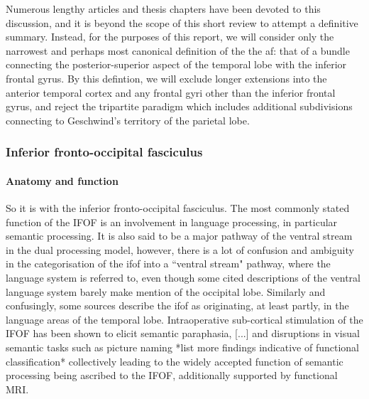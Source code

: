Numerous lengthy articles and thesis chapters have been devoted to this discussion, and it is beyond the scope of this short review to attempt a definitive summary.
Instead, for the purposes of this report, we will consider only the narrowest and perhaps most canonical definition of the the \gls{af}: that of a bundle connecting the posterior-superior aspect of the temporal lobe with the inferior frontal gyrus.
By this defintion, we will exclude longer extensions into the anterior temporal cortex\autocite{Giampiccolo2022a} and any frontal gyri other than the inferior frontal gyrus, and reject the tripartite paradigm which includes additional subdivisions connecting to Geschwind's territory of the parietal lobe.\autocite{Catani2005,Martino2013a}

\subsubsection*{Inferior fronto-occipital fasciculus}

\paragraph*{Anatomy and function}

So it is with the inferior fronto-occipital fasciculus.
The most commonly stated function of the IFOF is an involvement in language processing, in particular semantic processing.
It is also said to be a major pathway of the ventral stream in the dual processing model\autocite{Duffau2013a,Rollans2018,Voets2017,DavidPoeppel2012}, however, there is a lot of confusion and ambiguity in the categorisation of the \gls{ifof} into a ``ventral stream" pathway, where the language system is referred to, even though some cited descriptions of the ventral language system barely make mention of the occipital lobe\autocite{DavidPoeppel2012,Hickok2004}.
Similarly and confusingly, some sources describe the \gls{ifof} as originating, at least partly, in the language areas of the temporal lobe.\autocite{Bajada2015a,Weiller2021}
Intraoperative sub-cortical stimulation of the IFOF has been shown to elicit semantic paraphasia, [...] and disruptions in visual semantic tasks such as picture naming \autocite{Rollans2018} *list more findings indicative of functional classification*
collectively leading to the widely accepted function of semantic processing being ascribed to the IFOF, additionally supported by functional MRI.

